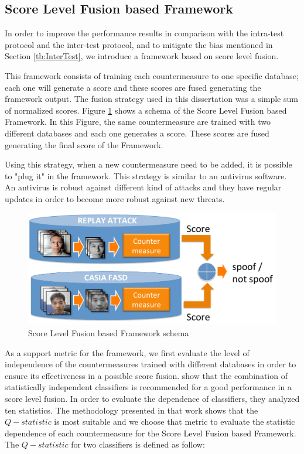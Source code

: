 \subsection{Score Level Fusion based Framework}
\label{sec:framework}

In order to improve the performance results in comparison with the intra-test protocol and the inter-test protocol, and to mitigate the bias mentioned in Section \ref{tb:InterTest}, we introduce a framework based on score level fusion. 

This framework consists of training each countermeasure to one specific database; each one will generate a score and these scores are fused generating the framework output. The fusion strategy used in this dissertation was a simple sum of normalized scores. Figure \ref{img:fusion_framework} shows a schema of the Score Level Fusion based Framework. In this Figure, the same countermeasure are trained with two different databases and each one generates a score. These scores are fused generating the final score of the Framework. 

Using this strategy, when a new countermeasure need to be added, it is possible to "plug it" in the framework. This strategy is similar to an antivirus software. An antivirus is robust against different kind of attacks and they have regular updates in  order to become more robust against new threats.

\begin{figure}[!htb]
\begin{center}
\includegraphics [width=12cm] {images/fusion_framework.pdf}
\caption[Score Level Fusion based Framework schema]{Score Level Fusion based Framework schema} \label{img:fusion_framework}
\end{center}
\end{figure}


As a support metric for the framework, we first evaluate the level of independence of the countermeasures trained with different databases in order to ensure its effectiveness in a possible score fusion. \cite{kuncheva2003measures} show that the combination of statistically independent classifiers is recommended for a good performance in a score level fusion. In order to evaluate the dependence of classifiers, they analyzed ten statistics. The methodology presented in that work shows that the $Q-statistic$ is most suitable and we choose that metric to evaluate the statistic dependence of each countermeasure for the Score Level Fusion based Framework. The $Q-statistic$ for two classifiers is defined as follow:

